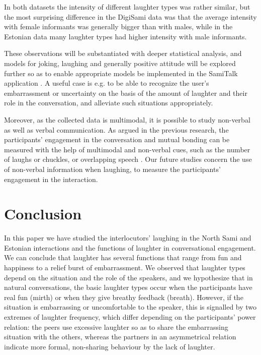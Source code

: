 \documentclass[10pt,journal,compsoc]{IEEEtran}
\begin{document}
In both datasets the intensity of different laughter types was rather similar, but the most surprising difference in the DigiSami data was that the average intensity with female informants was generally bigger than with males, while in the Estonian data many laughter types had higher intensity with male informants.

These observations will be substantiated with deeper statistical analysis, and models for joking, laughing and generally positive attitude will be explored further so as to enable appropriate models be implemented in the SamiTalk application \cite{Wilcock:ea:IWSDS:16}. A useful case is e.g. to be able to recognize the user's embarrassment or uncertainty on the basis of the amount of laughter and their role in the conversation, and alleviate such situations appropriately.

Moreover, as the collected data is multimodal, it is possible to study non-verbal as well as verbal communication. As argued in the previous research, the participants' engagement in the conversation and mutual bonding can be measured with the help of multimodal and non-verbal cues, such as the number of laughs or chuckles, or overlapping speech \cite{Bonin:16}. Our future studies concern the use of non-verbal information when laughing, to measure the participants' engagement in the interaction.


\section{Conclusion}
\label{sec:conclusion}

In this paper we have studied the interlocutors' laughing in the North Sami and Estonian interactions and the functions of laughter in conversational engagement. We can conclude that laughter has several functions that range from fun and happiness to a relief burst of embarrassment. We observed that laughter types depend on the situation and the role of the speakers, and we hypothesize that in natural conversations, the basic laughter types occur when the participants have real fun (mirth) or when they give breathy feedback (breath). However, if the situation is embarrassing or uncomfortable to the speaker, this is signalled by two extremes of laughter frequency, which differ depending on the participants' power relation: the peers use excessive laughter so as to share the embarrassing situation with the others, whereas the partners in an asymmetrical relation indicate more formal, non-sharing behaviour by the lack of laughter.
\end{document}
